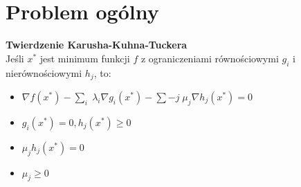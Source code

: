 \section{Problem ogólny}
\textbf{Twierdzenie Karusha-Kuhna-Tuckera} \\
Jeśli \( x^* \) jest minimum funkcji \( f \) z ograniczeniami równościowymi \( g_i \) i nierównościowymi \( h_j \), to:
\begin{itemize}
\onehalfspacing
    \item \( \nabla f(x^*) - \sum_{i}\; \lambda_i \nabla g_i(x^*) - \sum-{j}\; \mu_j \nabla h_j(x^*) = 0 \)
    \item \( g_i(x^*) = 0, h_j(x^*) \geq 0 \)
    \item \( \mu_jh_j(x^*) = 0 \)
    \item \( \mu_j \geq 0 \)
\end{itemize}